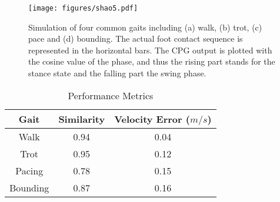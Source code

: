 \documentclass[letterpaper, 10 pt, journal, twoside]{IEEEtran} %
\begin{document}
\begin{figure}[!t]
	\centering
	\texttt{[image: figures/shao5.pdf]}
	\caption{Simulation of four common gaits including (a) walk, (b) trot, (c) pace and (d) bounding. The actual foot contact sequence is represented in the horizontal bars. The CPG output is plotted with the cosine value of the phase, and thus the rising part stands for the stance state and the falling part the swing phase.}
	\label{result_1}
\end{figure}
\begin{table}[!t]
	\renewcommand{\arraystretch}{1.3}
	\caption{Performance Metrics}
	\label{result_table}
	\centering
	\begin{tabular}{|c|c|c|}
		\hline
		Gait & Similarity & Velocity Error ($m/s$)\\
		\hline
		Walk & 0.94 & 0.04 \\
		\hline
		Trot & 0.95 & 0.12 \\
		\hline
		Pacing & 0.78 & 0.15 \\
		\hline
		Bounding & 0.87 & 0.16 \\
		\hline
	\end{tabular}
\end{table}
\end{document}
